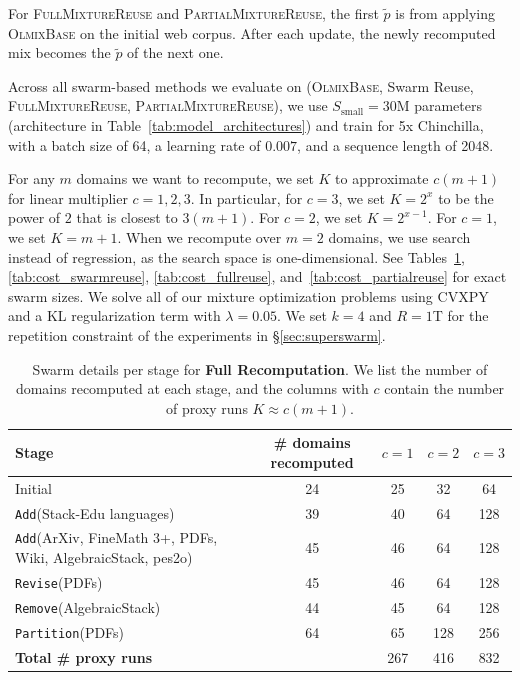 \documentclass[table]{ai2style/ai2}
\newcommand{\Ssmall}[0]{S_{\text{small}}}
\newcommand{\base}[0]{\textsc{OlmixBase}\xspace}
\newcommand{\fullmixreuse}[0]{\textsc{FullMixtureReuse}\xspace}
\newcommand{\partialmixreuse}[0]{\textsc{PartialMixtureReuse}\xspace}
\newcommand{\Add}[0]{\texttt{Add}\xspace}
\newcommand{\Remove}[0]{\texttt{Remove}\xspace}
\newcommand{\Partition}[0]{\texttt{Partition}\xspace}
\newcommand{\Revise}[0]{\texttt{Revise}\xspace}
\begin{document}
For \fullmixreuse and \partialmixreuse, the first $\tilde{p}$ is from applying \base on the initial web corpus. After each update, the newly recomputed mix becomes the $\tilde{p}$ of the next one.

Across all swarm-based methods we evaluate on (\base, Swarm Reuse, \fullmixreuse, \partialmixreuse), we use $\Ssmall=30$M parameters (architecture in Table~\ref{tab:model_architectures}) and train for 5x Chinchilla, with a batch size of 64, a learning rate of $0.007$, and a sequence length of 2048. 

For any $m$ domains we want to recompute, we set $K$ to approximate $c(m + 1)$ for linear multiplier $c = 1, 2, 3$. In particular, for $c = 3$, we set $K = 2^x$ to be the power of $2$ that is closest to $3(m+1)$. For $c = 2$, we set $K = 2^{x-1}$. For $c = 1$, we set $K = m+1$. When we recompute over $m=2$ domains, we use search instead of regression, as the search space is one-dimensional. See Tables~\ref{tab:cost_fullrecomputation}, \ref{tab:cost_swarmreuse}, \ref{tab:cost_fullreuse}, and~\ref{tab:cost_partialreuse} for exact swarm sizes.
We solve all of our mixture optimization problems using CVXPY and a KL regularization term with $\lambda=0.05$. We set $k=4$ and $R = 1$T for the repetition constraint of the experiments in \S\ref{sec:superswarm}. 

\begin{table}[!h]
\centering
\caption{Swarm details per stage for \textbf{Full Recomputation}. We list the number of domains recomputed at each stage, and the columns with $c$ contain the number of proxy runs $K \approx c(m+1)$.}
\footnotesize
\setlength{\tabcolsep}{6pt}
\begin{tabular}{lcccc}
\toprule
\textbf{Stage} & \textbf{\# domains recomputed} & \textbf{$c=1$} & \textbf{$c=2$} & \textbf{$c=3$} \\
\midrule
Initial      & 24 & 25 & 32 & 64 \\
\Add (Stack-Edu languages)  & 39 & 40 & 64 & 128 \\
\Add (ArXiv, FineMath 3+, PDFs, Wiki, AlgebraicStack, pes2o) & 45 & 46 & 64 & 128 \\
\Revise (PDFs) & 45 & 46 & 64 & 128 \\
\Remove (AlgebraicStack) & 44 & 45 & 64 & 128 \\
\Partition (PDFs) & 64 & 65 & 128 & 256 \\
\midrule
\textbf{Total \# proxy runs} & & 267 & 416 & 832 \\
\bottomrule
\end{tabular}
\label{tab:cost_fullrecomputation}
\end{table}
\end{document}
